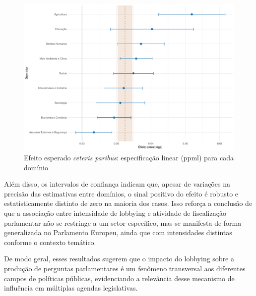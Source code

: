\begin{figure}[htbp]
\centering
\includegraphics[width=\textwidth]{figures/fig_coeff_domains.pdf}
\caption{Efeito esperado \textit{ceteris paribus}: especificação linear (\acrshort{ppml}) para cada domínio}
\label{fig:effect_linear_ppml_domains}
\end{figure}

Além disso, os intervalos de confiança indicam que, apesar de variações na precisão das estimativas entre domínios, o sinal positivo do efeito é robusto e estatisticamente distinto de zero na maioria dos casos. Isso reforça a conclusão de que a associação entre intensidade de lobbying e atividade de fiscalização parlamentar não se restringe a um setor específico, mas se manifesta de forma generalizada no Parlamento Europeu, ainda que com intensidades distintas conforme o contexto temático.

De modo geral, esses resultados sugerem que o impacto do lobbying sobre a produção de perguntas parlamentares é um fenômeno transversal aos diferentes campos de políticas públicas, evidenciando a relevância desse mecanismo de influência em múltiplas agendas legislativas.


